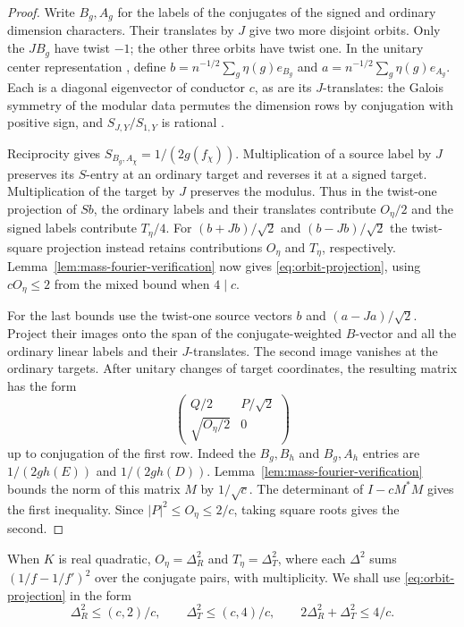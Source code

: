\documentclass[11pt,reqno]{amsart}
\theoremstyle{remark}\newtheorem{remark}[theorem]{Remark}
\numberwithin{equation}{section}
\begin{document}
\begin{proof}
Write $B_g,A_g$ for the labels of the conjugates of the signed and
ordinary dimension characters. Their translates by $J$ give two more
disjoint orbits. Only the $JB_g$ have twist $-1$; the other three
orbits have twist one. In the unitary center representation
\cite[Proposition~2.12]{ENO}, define $b=n^{-1/2}\sum_g\eta(g)e_{B_g}$
and $a=n^{-1/2}\sum_g\eta(g)e_{A_g}$. Each is a diagonal
eigenvector of conductor $c$, as are its $J$-translates: the Galois
symmetry of the modular data permutes the dimension rows by conjugation
with positive sign, and $S_{J,Y}/S_{1,Y}$ is rational
\cite[Theorem~II and Remark~4.5]{DLN}.

Reciprocity gives $S_{B_g,A_\chi}=1/(2g(f_\chi))$.
Multiplication of a source label by $J$ preserves its $S$-entry at
an ordinary target and reverses it at a signed target. Multiplication
of the target by $J$ preserves the modulus. Thus in the twist-one
projection of $Sb$, the ordinary labels and their translates
contribute $O_\eta/2$ and the signed labels contribute $T_\eta/4$.
For $(b+Jb)/\sqrt2$ and $(b-Jb)/\sqrt2$ the twist-square
projection instead retains contributions $O_\eta$ and $T_\eta$,
respectively. Lemma~\ref{lem:mass-fourier-verification} now gives
\eqref{eq:orbit-projection}, using $cO_\eta\le2$ from the mixed
bound when $4\mid c$.

For the last bounds use the twist-one source vectors $b$ and
$(a-Ja)/\sqrt2$. Project their images onto the span of the
conjugate-weighted $B$-vector and all the ordinary linear labels and their
$J$-translates. The second image vanishes at the ordinary targets.
After unitary changes of target coordinates, the resulting matrix
has the form
\[
   \begin{pmatrix}Q/2&P/\sqrt2\\ \sqrt{O_\eta/2}&0\end{pmatrix}
\]
up to conjugation of the first row. Indeed the $B_g,B_h$ and
$B_g,A_h$ entries are $1/(2gh(E))$ and $1/(2gh(D))$.
Lemma~\ref{lem:mass-fourier-verification} bounds the norm of this
matrix $M$ by $1/\sqrt c$. The determinant of $I-cM^*M$ gives the
first inequality. Since $|P|^2\le O_\eta\le2/c$, taking square
roots gives the second.
\end{proof}

When $K$ is real quadratic, $O_\eta=\Delta_R^2$ and $T_\eta=\Delta_T^2$,
where each $\Delta^2$ sums $(1/f-1/f')^2$ over the conjugate pairs,
with multiplicity. We shall use \eqref{eq:orbit-projection} in the form
\begin{equation}\label{eq:quadratic-fourier-bounds}
 \Delta_R^2\le(c,2)/c,\qquad \Delta_T^2\le(c,4)/c,\qquad
 2\Delta_R^2+\Delta_T^2\le4/c.
\end{equation}
\end{document}
